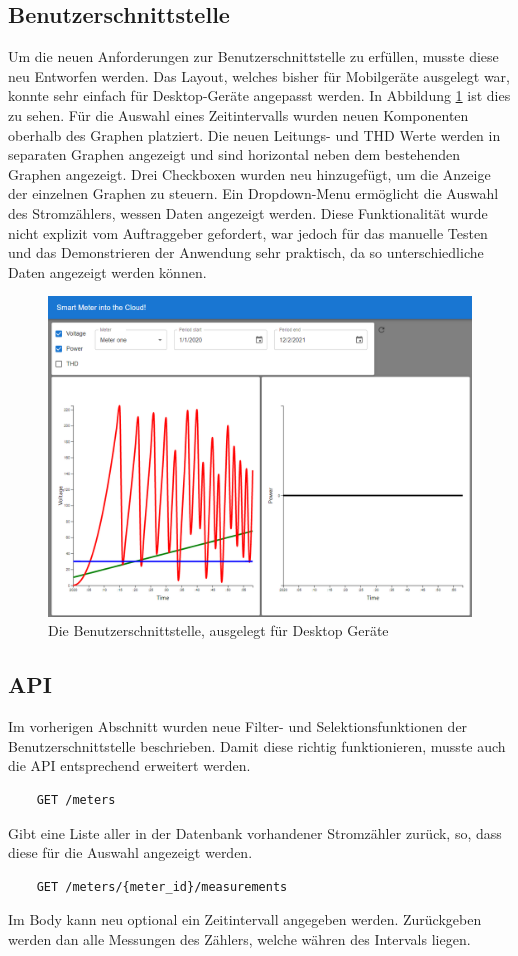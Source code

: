 \subsection{Benutzerschnittstelle}
Um die neuen Anforderungen zur Benutzerschnittstelle zu erfüllen, musste diese neu Entworfen werden.
Das Layout, welches bisher für Mobilgeräte ausgelegt war, konnte sehr einfach für Desktop-Geräte angepasst werden.
In Abbildung \ref{fig:phase2-ui} ist dies zu sehen.
Für die Auswahl eines Zeitintervalls wurden neuen Komponenten oberhalb des Graphen platziert.
Die neuen Leitungs- und \ac{THD} Werte werden in separaten Graphen angezeigt und sind horizontal neben dem bestehenden Graphen angezeigt.
Drei Checkboxen wurden neu hinzugefügt, um die Anzeige der einzelnen Graphen zu steuern.
Ein Dropdown-Menu ermöglicht die Auswahl des Stromzählers, wessen Daten angezeigt werden.
Diese Funktionalität wurde nicht explizit vom Auftraggeber gefordert, war jedoch für das manuelle Testen
und das Demonstrieren der Anwendung sehr praktisch, da so unterschiedliche Daten angezeigt werden können.
\begin{figure}[H]
    \centering
    \includegraphics[width=1.0\textwidth]{gfx/phase2}
    \caption{
        Die Benutzerschnittstelle, ausgelegt für Desktop Geräte
    }
    \label{fig:phase2-ui}
\end{figure}
\subsection{\ac{API}}
Im vorherigen Abschnitt wurden neue Filter- und Selektionsfunktionen der Benutzerschnittstelle beschrieben.
Damit diese richtig funktionieren, musste auch die \ac{API} entsprechend erweitert werden.
\begin{verbatim}
    GET /meters
\end{verbatim}
Gibt eine Liste aller in der Datenbank vorhandener Stromzähler zurück, so, dass diese für die Auswahl angezeigt werden.
\begin{verbatim}
    GET /meters/{meter_id}/measurements
\end{verbatim}
Im Body kann neu optional ein Zeitintervall angegeben werden.
Zurückgeben werden dan alle Messungen des Zählers, welche währen des Intervals liegen.



